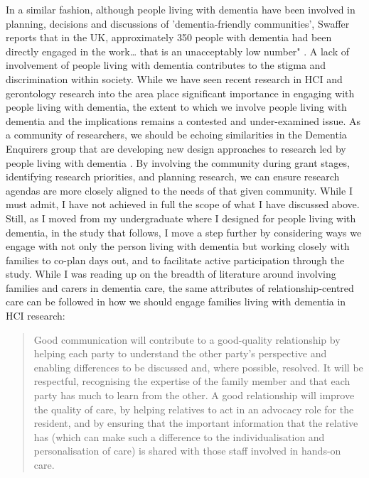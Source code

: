 In a similar fashion, although people living with dementia have been involved in planning, decisions and discussions of 'dementia-friendly communities', Swaffer reports that in the UK, approximately 350 people with dementia had been directly engaged in the work… that is an unacceptably low number" \citep{swaffer_dementia_2014}. A lack of involvement of people living with dementia contributes to the stigma and discrimination within society. While we have seen recent research in HCI and gerontology research into the area place significant importance in engaging with people living with dementia, the extent to which we involve people living with dementia and the implications remains a contested and under-examined issue. As a community of researchers, we should be echoing similarities in the Dementia Enquirers group that are developing new design approaches to research led by people living with dementia \citep{diaries_deep_2020}. By involving the community during grant stages, identifying research priorities, and planning research, we can ensure research agendas are more closely aligned to the needs of that given community. While I must admit, I have not achieved in full the scope of what I have discussed above. Still, as I moved from my undergraduate where I designed for people living with dementia, in the study that follows, I move a step further by considering ways we engage with not only the person living with dementia but working closely with families to co-plan days out, and to facilitate active participation through the study. While I was reading up on the breadth of literature around involving families and carers in dementia care, the same attributes of relationship-centred care can be followed in how we should engage families living with dementia in HCI research:
\begin{quote}
Good communication will contribute to a good-quality relationship by helping each party to understand the other party's perspective and enabling differences to be discussed and, where possible, resolved. It will be respectful, recognising the expertise of the family member and that each party has much to learn from the other. A good relationship will improve the quality of care, by helping relatives to act in an advocacy role for the resident, and by ensuring that the important information that the relative has (which can make such a difference to the individualisation and personalisation of care) is shared with those staff involved in hands-on care. \citep{keady_involving_2007}
\end{quote}

